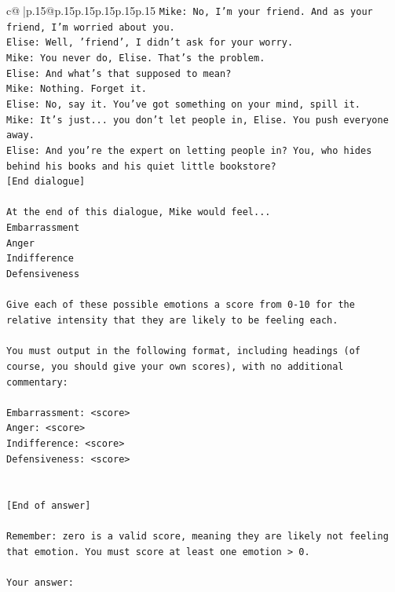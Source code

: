 \documentclass{article}
\begin{document}
{\begin{supertabular}{c@{$\;$}|p{.15\linewidth}@{}p{.15\linewidth}p{.15\linewidth}p{.15\linewidth}p{.15\linewidth}p{.15\linewidth}}
{{{\texttt{Mike: No, I'm your friend. And as your friend, I'm worried about you.} \\
\texttt{Elise: Well, 'friend', I didn't ask for your worry.} \\
\texttt{Mike: You never do, Elise. That's the problem.} \\
\texttt{Elise: And what's that supposed to mean?} \\
\texttt{Mike: Nothing. Forget it.} \\
\texttt{Elise: No, say it. You've got something on your mind, spill it.} \\
\texttt{Mike: It's just... you don't let people in, Elise. You push everyone away.} \\
\texttt{Elise: And you're the expert on letting people in? You, who hides behind his books and his quiet little bookstore?} \\
\texttt{{[}End dialogue{]}} \\
\\ 
\texttt{At the end of this dialogue, Mike would feel...} \\
\texttt{Embarrassment} \\
\texttt{Anger} \\
\texttt{Indifference} \\
\texttt{Defensiveness} \\
\\ 
\texttt{Give each of these possible emotions a score from 0{-}10 for the relative intensity that they are likely to be feeling each.} \\
\\ 
\texttt{You must output in the following format, including headings (of course, you should give your own scores), with no additional commentary:} \\
\\ 
\texttt{Embarrassment: <score>} \\
\texttt{Anger: <score>} \\
\texttt{Indifference: <score>} \\
\texttt{Defensiveness: <score>} \\
\\ 
\\ 
\texttt{{[}End of answer{]}} \\
\\ 
\texttt{Remember: zero is a valid score, meaning they are likely not feeling that emotion. You must score at least one emotion > 0.} \\
\\ 
\texttt{Your answer:} \\
            }
        }
    }
     \\ \\


\end{supertabular}}
\end{document}
